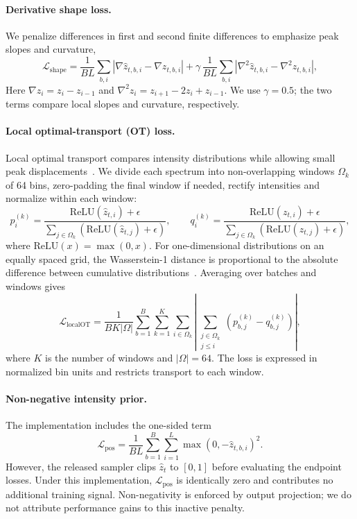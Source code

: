 \documentclass[pdflatex,sn-mathphys-num]{sn-jnl}%
\theoremstyle{thmstyleone}%
\theoremstyle{thmstyletwo}%
\theoremstyle{thmstylethree}%
\begin{document}
\paragraph{Derivative shape loss.}
We penalize differences in first and second finite differences to emphasize peak slopes and curvature,
\[
\mathcal{L}_{\mathrm{shape}}
=
\frac{1}{BL}\sum_{b,i}
\left|
\nabla \hat{z}_{t,b,i}-\nabla z_{t,b,i}
\right|
+
\gamma\,
\frac{1}{BL}\sum_{b,i}
\left|
\nabla^2 \hat{z}_{t,b,i}-\nabla^2 z_{t,b,i}
\right|,
\]
Here $\nabla z_i=z_i-z_{i-1}$ and
$\nabla^2 z_i=z_{i+1}-2z_i+z_{i-1}$.
We use $\gamma=0.5$; the two terms compare local slopes and curvature, respectively.

\paragraph{Local optimal-transport (OT) loss.}
Local optimal transport compares intensity distributions while allowing small peak displacements~\cite{peyre2019computational}. We divide each spectrum into non-overlapping windows $\Omega_k$ of 64 bins, zero-padding the final window if needed, rectify intensities and normalize within each window:
\[
p_i^{(k)}=\frac{\mathrm{ReLU}(\hat{z}_{t,i})+\epsilon}{\sum_{j\in\Omega_k}\left(\mathrm{ReLU}(\hat{z}_{t,j})+\epsilon\right)},
\qquad
q_i^{(k)}=\frac{\mathrm{ReLU}(z_{t,i})+\epsilon}{\sum_{j\in\Omega_k}\left(\mathrm{ReLU}(z_{t,j})+\epsilon\right)},
\]
where $\mathrm{ReLU}(x)=\max(0,x)$. For one-dimensional distributions on an equally spaced grid, the Wasserstein-1 distance is proportional to the absolute difference between cumulative distributions~\cite{peyre2019computational}. Averaging over batches and windows gives
\[
\mathcal{L}_{\mathrm{localOT}}
=
\frac{1}{BK|\Omega|}
\sum_{b=1}^{B}\sum_{k=1}^{K}
\sum_{i\in\Omega_k}
\left|
\sum_{\substack{j\in\Omega_k\\j\le i}}\left(p_{b,j}^{(k)}-q_{b,j}^{(k)}\right)
\right|,
\]
where $K$ is the number of windows and $|\Omega|=64$. The loss is expressed in normalized bin units and restricts transport to each window.

\paragraph{Non-negative intensity prior.}
The implementation includes the one-sided term
\[
\mathcal{L}_{\mathrm{pos}}
=
\frac{1}{BL}
\sum_{b=1}^{B}\sum_{i=1}^{L}
\max(0,-\hat{z}_{t,b,i})^2 .
\]
However, the released sampler clips $\hat z_t$ to $[0,1]$ before evaluating the endpoint losses. Under this implementation, $\mathcal{L}_{\mathrm{pos}}$ is identically zero and contributes no additional training signal. Non-negativity is enforced by output projection; we do not attribute performance gains to this inactive penalty.
\end{document}
